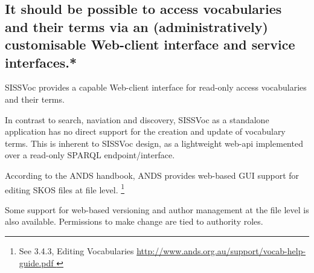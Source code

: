 \documentclass[10pt,a4paper]{article}
\begin{document}
\begin{flushleft}
% 
% 
% 

  \subsection{
  It should be possible to access vocabularies and their terms via an 
  (administratively) customisable Web-client interface and service interfaces.* } 


  SISSVoc provides a capable Web-client interface for read-only access vocabularies and their terms.

  In contrast to search, naviation and discovery, SISSVoc as a standalone application has no direct 
  support for the creation and update of vocabulary terms. This is inherent to SISSVoc design, as a 
  lightweight web-api implemented over a read-only SPARQL endpoint/interface.  

%    
  According to the ANDS handbook, ANDS provides web-based GUI support for editing SKOS files at file level. 
  \footnote { See 3.4.3, Editing Vocabularies \url{ http://www.ands.org.au/support/vocab-help-guide.pdf } 
  }

  Some support for web-based versioning and author management at the file level
is also available. Permissions to make change are tied to authority roles.


\end{flushleft}
\end{document}
